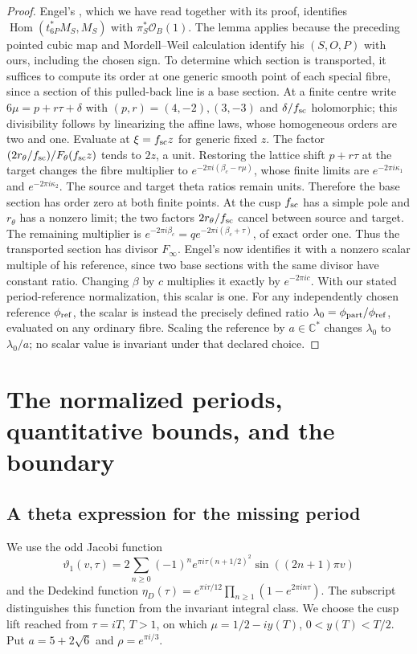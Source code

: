 \begin{proof}
Engel's \cite[Lemma 2.1]{Engel2026}, which we have read together with its proof, identifies $\operatorname{Hom}(t_{6P}^*M_S,M_S)$ with $\pi_S^*\mathcal O_B(1)$. The lemma applies because the preceding pointed cubic map and Mordell--Weil calculation identify his $(S,O,P)$ with ours, including the chosen sign. To determine which section is transported, it suffices to compute its order at one generic smooth point of each special fibre, since a section of this pulled-back line is a base section. At a finite centre write $6\mu=p+r\tau+\delta$ with $(p,r)=(4,-2),(3,-3)$ and $\delta/f_{\rm sc}$ holomorphic; this divisibility follows by linearizing the affine laws, whose homogeneous orders are two and one. Evaluate at $\xi=f_{\rm sc}z$ for generic fixed $z$. The factor $(2r_\theta/f_{\rm sc})/F_\theta(f_{\rm sc}z)$ tends to $2z$, a unit. Restoring the lattice shift $p+r\tau$ at the target changes the fibre multiplier to $e^{-2\pi i(\beta_c-r\mu)}$, whose finite limits are $e^{-2\pi i\kappa_1}$ and $e^{-2\pi i\kappa_2}$. The source and target theta ratios remain units. Therefore the base section has order zero at both finite points. At the cusp $f_{\rm sc}$ has a simple pole and $r_\theta$ has a nonzero limit; the two factors $2r_\theta/f_{\rm sc}$ cancel between source and target. The remaining multiplier is
$e^{-2\pi i\beta_c}=q e^{-2\pi i(\beta_c+\tau)}$, of exact order one. Thus the transported section has divisor $F_\infty$. Engel's \cite[Corollary 2.2]{Engel2026} now identifies it with a nonzero scalar multiple of his reference, since two base sections with the same divisor have constant ratio. Changing $\beta$ by $c$ multiplies it exactly by $e^{-2\pi ic}$. With our stated period-reference normalization, this scalar is one. For any independently chosen reference $\phi_{\rm ref}$, the scalar is instead the precisely defined ratio $\lambda_0=\phi_{\rm part}/\phi_{\rm ref}$, evaluated on any ordinary fibre. Scaling the reference by $a\in\mathbb C^*$ changes $\lambda_0$ to $\lambda_0/a$; no scalar value is invariant under that declared choice.
\end{proof}


\section{The normalized periods, quantitative bounds, and the boundary}\label{fam:section:C}

\subsection{A theta expression for the missing period}\label{fam:section:C.1}
We use the odd Jacobi function
\[
 \vartheta_1(v,\tau)=2\sum_{n\geq0}(-1)^n
 e^{\pi i\tau(n+1/2)^2}\sin((2n+1)\pi v)
\]
and the Dedekind function
\(\eta_D(\tau)=e^{\pi i\tau/12}\prod_{n\geq1}(1-e^{2\pi in\tau})\).
The subscript distinguishes this function from the invariant integral class.
We choose the cusp lift reached from \(\tau=iT\), \(T>1\), on which
\(\mu=1/2-iy(T)\), \(0<y(T)<T/2\). Put
\(a=5+2\sqrt6\) and \(\rho=e^{\pi i/3}\).


